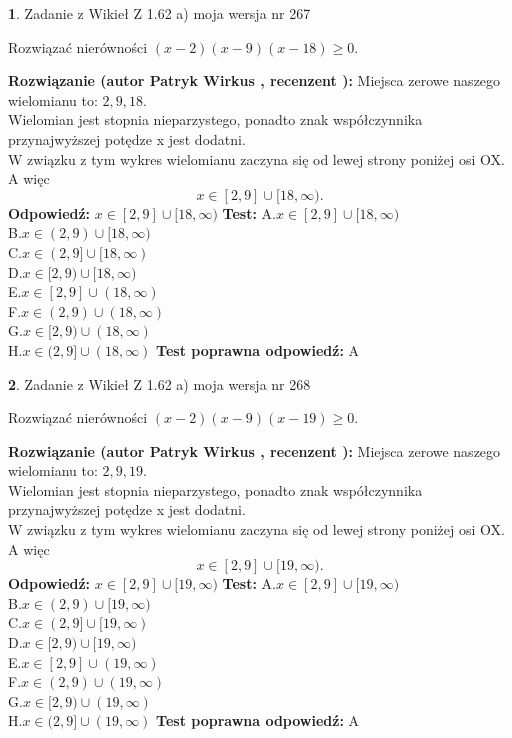 \documentclass[12pt, a4paper]{article}
\theoremstyle{definition} %
\newtheorem{zad}{}
\newcommand{\zadStart}[1]{\begin{zad}#1\newline}
\newcommand{\zadStop}{\end{zad}}
\newcommand{\rozwStart}[2]{\noindent \textbf{Rozwiązanie (autor #1 , recenzent #2): }\newline}
\newcommand{\rozwStop}{\newline}
\newcommand{\odpStart}{\noindent \textbf{Odpowiedź:}\newline}
\newcommand{\odpStop}{\newline}
\newcommand{\testStart}{\noindent \textbf{Test:}\newline}
\newcommand{\testStop}{\newline}
\newcommand{\kluczStart}{\noindent \textbf{Test poprawna odpowiedź:}\newline}
\newcommand{\kluczStop}{\newline}
\begin{document}
\zadStart{Zadanie z Wikieł Z 1.62 a) moja wersja nr 267}

Rozwiązać nierówności $(x-2)(x-9)(x-18)\ge0$.
\zadStop
\rozwStart{Patryk Wirkus}{}
Miejsca zerowe naszego wielomianu to: $2, 9, 18$.\\
Wielomian jest stopnia nieparzystego, ponadto znak współczynnika przy\linebreak najwyższej potędze x jest dodatni.\\ W związku z tym wykres wielomianu zaczyna się od lewej strony poniżej osi OX. A więc $$x \in [2,9] \cup [18,\infty).$$
\rozwStop
\odpStart
$x \in [2,9] \cup [18,\infty)$
\odpStop
\testStart
A.$x \in [2,9] \cup [18,\infty)$\\
B.$x \in (2,9) \cup [18,\infty)$\\
C.$x \in (2,9] \cup [18,\infty)$\\
D.$x \in [2,9) \cup [18,\infty)$\\
E.$x \in [2,9] \cup (18,\infty)$\\
F.$x \in (2,9) \cup (18,\infty)$\\
G.$x \in [2,9) \cup (18,\infty)$\\
H.$x \in (2,9] \cup (18,\infty)$
\testStop
\kluczStart
A
\kluczStop



\zadStart{Zadanie z Wikieł Z 1.62 a) moja wersja nr 268}

Rozwiązać nierówności $(x-2)(x-9)(x-19)\ge0$.
\zadStop
\rozwStart{Patryk Wirkus}{}
Miejsca zerowe naszego wielomianu to: $2, 9, 19$.\\
Wielomian jest stopnia nieparzystego, ponadto znak współczynnika przy\linebreak najwyższej potędze x jest dodatni.\\ W związku z tym wykres wielomianu zaczyna się od lewej strony poniżej osi OX. A więc $$x \in [2,9] \cup [19,\infty).$$
\rozwStop
\odpStart
$x \in [2,9] \cup [19,\infty)$
\odpStop
\testStart
A.$x \in [2,9] \cup [19,\infty)$\\
B.$x \in (2,9) \cup [19,\infty)$\\
C.$x \in (2,9] \cup [19,\infty)$\\
D.$x \in [2,9) \cup [19,\infty)$\\
E.$x \in [2,9] \cup (19,\infty)$\\
F.$x \in (2,9) \cup (19,\infty)$\\
G.$x \in [2,9) \cup (19,\infty)$\\
H.$x \in (2,9] \cup (19,\infty)$
\testStop
\kluczStart
A
\kluczStop
\end{document}
